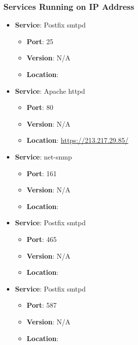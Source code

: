 \documentclass{article}
\begin{document}
\subsubsection*{Services Running on IP Address}

\begin{itemize}
    
        \item \textbf{Service}: Postfix smtpd
        \begin{itemize}
            \item \textbf{Port}: 25
            \item \textbf{Version}:  N/A 
            \item \textbf{Location}: \href{  }{  }
        \end{itemize}
    
        \item \textbf{Service}: Apache httpd
        \begin{itemize}
            \item \textbf{Port}: 80
            \item \textbf{Version}:  N/A 
            \item \textbf{Location}: \href{ https://213.217.29.85/ }{ https://213.217.29.85/ }
        \end{itemize}
    
        \item \textbf{Service}: net-snmp
        \begin{itemize}
            \item \textbf{Port}: 161
            \item \textbf{Version}:  N/A 
            \item \textbf{Location}: \href{  }{  }
        \end{itemize}
    
        \item \textbf{Service}: Postfix smtpd
        \begin{itemize}
            \item \textbf{Port}: 465
            \item \textbf{Version}:  N/A 
            \item \textbf{Location}: \href{  }{  }
        \end{itemize}
    
        \item \textbf{Service}: Postfix smtpd
        \begin{itemize}
            \item \textbf{Port}: 587
            \item \textbf{Version}:  N/A 
            \item \textbf{Location}: \href{  }{  }
        \end{itemize}
    
\end{itemize}
\end{document}
